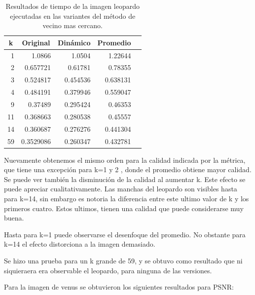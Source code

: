 \documentclass[a4paper]{article}
\newcounter{col}
\begin{document}
\begin{table}[H]
\centering
\begin{tabular}{|r|r|r|r|r|}
\hline
\multicolumn{1}{|c|}{k} & \multicolumn{1}{c|}{Original} & \multicolumn{1}{c|}{Dinámico} & \multicolumn{1}{c|}{Promedio} \\ \hline
1 & 1.0866 & 1.0504& 1.22644 \\ \hline
2 & 0.657721 &  0.61781 & 0.78355 \\ \hline
3 & 0.524817 &  0.454536& 0.638131 \\ \hline
4 &0.484191&  0.379946 &  0.559047 \\ \hline
9 & 0.37489& 0.295424& 0.46353 \\ \hline
11 & 0.368663 &   0.280538 & 0.45557 \\ \hline
14 & 0.360687 &   0.276276 &  0.441304 \\ \hline
59 &0.3529086&  0.260347 & 0.432781\\ \hline
\end{tabular}
\caption{Resultados de tiempo de la imagen leopardo ejecutadas en las variantes del m\'etodo de vecino mas cercano.}
\label{}
\end{table}

Nuevamente obtenemos el mismo orden para la calidad indicada por la métrica, que tiene una excepción para k=1 y 2 , donde el promedio obtiene mayor calidad.  Se puede ver también la disminución de la calidad al aumentar k. Este efecto se puede apreciar cualitativamente. Las manchas del leopardo son visibles hasta para k=14, sin embargo es notoria la diferencia entre este ultimo valor de k y los primeros cuatro. Estos ultimos, tienen una calidad que puede considerarse muy buena.

Hasta para k=1 puede observarse el desenfoque del promedio. No obstante para k=14 el efecto distorciona a la imagen demasiado.

Se hizo una  prueba para un k grande de 59, y se obtuvo como resultado que ni siquieraera era observable el leopardo, para ninguna de las versiones.


Para la imagen de venus se obtuvieron los siguientes resultados para PSNR:
\end{document}
